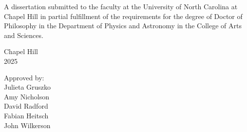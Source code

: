 \begin{titlepage}
\begin{center}


\begin{singlespace}
\bf
\MakeUppercase{{\thesistitle}}
\end{singlespace}

\vspace{61pt}
\large {\authorname}
\end{center}



\vspace{40pt}
\begin{center}
\begin{singlespace}
\noindent \large
A dissertation submitted to the faculty at the University of North Carolina at Chapel Hill in partial fulfillment of the requirements for the degree of Doctor of Philosophy in the Department of Physics and Astronomy in the College of Arts and Sciences.
\end{singlespace}
\end{center}


\vspace{40pt}
\begin{center}
\begin{singlespace} \large
Chapel Hill \\
2025
\end{singlespace}
\end{center}


\vspace{40pt}
\begin{flushright}
\begin{minipage}[t]{1.5in} \large
Approved by:\\
Julieta Gruszko\\
Amy Nicholson\\
David Radford\\
Fabian Heitsch\\
John Wilkerson
\end{minipage}
\end{flushright}

\end{titlepage}
